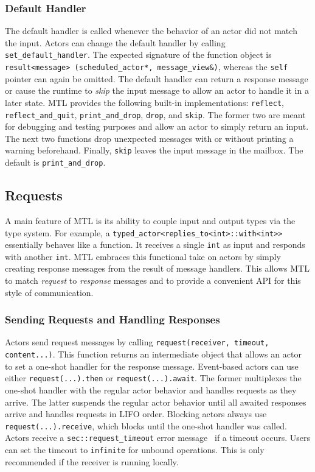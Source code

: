 \subsubsection{Default Handler}
\label{default-handler}

The default handler is called whenever the behavior of an actor did not match
the input. Actors can change the default handler by calling
\lstinline^set_default_handler^. The expected signature of the function object
is \lstinline^result<message> (scheduled_actor*, message_view&)^, whereas the
\lstinline^self^ pointer can again be omitted. The default handler can return a
response message or cause the runtime to \emph{skip} the input message to allow
an actor to handle it in a later state. MTL provides the following built-in
implementations: \lstinline^reflect^, \lstinline^reflect_and_quit^,
\lstinline^print_and_drop^, \lstinline^drop^, and \lstinline^skip^. The former
two are meant for debugging and testing purposes and allow an actor to simply
return an input. The next two functions drop unexpected messages with or
without printing a warning beforehand. Finally, \lstinline^skip^ leaves the
input message in the mailbox. The default is \lstinline^print_and_drop^.

\subsection{Requests}
\label{request}

A main feature of MTL is its ability to couple input and output types via the
type system. For example, a \lstinline^typed_actor<replies_to<int>::with<int>>^
essentially behaves like a function. It receives a single \lstinline^int^ as
input and responds with another \lstinline^int^. MTL embraces this functional
take on actors by simply creating response messages from the result of message
handlers. This allows MTL to match \emph{request} to \emph{response} messages
and to provide a convenient API for this style of communication.

\subsubsection{Sending Requests and Handling Responses}
\label{handling-response}

Actors send request messages by calling \lstinline^request(receiver, timeout, content...)^. This function returns an intermediate object that allows an actor to set a one-shot handler for the response message. Event-based actors can use either \lstinline^request(...).then^ or \lstinline^request(...).await^. The former multiplexes the one-shot handler with the regular actor behavior and handles requests as they arrive. The latter suspends the regular actor behavior until all awaited responses arrive and handles requests in LIFO order. Blocking actors always use \lstinline^request(...).receive^, which blocks until the one-shot handler was called. Actors receive a \lstinline^sec::request_timeout^  error message~ if a timeout occurs. Users can set the timeout to \lstinline^infinite^ for unbound operations. This is only recommended if the receiver is running locally.

